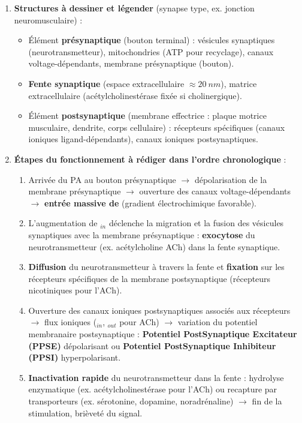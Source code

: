 \documentclass[11pt]{article}
\begin{document}
\begin{methode}
\begin{enumerate}
\item \textbf{Structures à dessiner et légender} (synapse type, ex. jonction neuromusculaire) :
\begin{itemize}
\item Élément \textbf{présynaptique} (bouton terminal) : vésicules synaptiques (neurotransmetteur), mitochondries (ATP pour recyclage), canaux  voltage-dépendants, membrane présynaptique (bouton).
\item \textbf{Fente synaptique} (espace extracellulaire $\approx \SI{20}{nm}$), matrice extracellulaire (acétylcholinestérase fixée si cholinergique).
\item Élément \textbf{postsynaptique} (membrane effectrice : plaque motrice musculaire, dendrite, corps cellulaire) : récepteurs spécifiques (canaux ioniques ligand-dépendants), canaux ioniques postsynaptiques.
\end{itemize}
\item \textbf{Étapes du fonctionnement à rédiger dans l'ordre chronologique} :
\begin{enumerate}
\item Arrivée du PA au bouton présynaptique $\rightarrow$ dépolarisation de la membrane présynaptique $\rightarrow$ ouverture des canaux  voltage-dépendants $\rightarrow$ \textbf{entrée massive de } (gradient électrochimique favorable).
\item L'augmentation de \ce{[Ca^{2+}]}$_{in}$ déclenche la migration et la fusion des vésicules synaptiques avec la membrane présynaptique : \textbf{exocytose} du neurotransmetteur (ex. acétylcholine ACh) dans la fente synaptique.
\item \textbf{Diffusion} du neurotransmetteur à travers la fente et \textbf{fixation} sur les récepteurs spécifiques de la membrane postsynaptique (récepteurs nicotiniques pour l'ACh).
\item Ouverture des canaux ioniques postsynaptiques associés aux récepteurs $\rightarrow$ flux ioniques ($_{in}$, $_{out}$ pour ACh) $\rightarrow$ variation du potentiel membranaire postsynaptique : \textbf{Potentiel PostSynaptique Excitateur (PPSE)} dépolarisant ou \textbf{Potentiel PostSynaptique Inhibiteur (PPSI)} hyperpolarisant.
\item \textbf{Inactivation rapide} du neurotransmetteur dans la fente : hydrolyse enzymatique (ex. acétylcholinestérase pour l'ACh) ou recapture par transporteurs (ex. sérotonine, dopamine, noradrénaline) $\rightarrow$ fin de la stimulation, brièveté du signal.

\end{enumerate}
\end{enumerate}
\end{methode}
\end{document}

